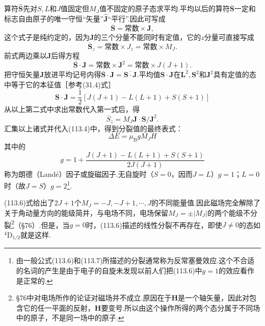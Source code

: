 算符$\hat{\boldsymbol{S}}$先对$S,L$和$J$值固定但$M_J$值不固定的原子态求平均.平均以后的算符$\overline{\boldsymbol{S}}$一定和标志自由原子的唯一守恒“矢量”$\hat{\boldsymbol{J}}$“平行”.因此可写成
\begin{equation*}
  \overline{\boldsymbol{S}}=\text{常数}\times\boldsymbol{J},
\end{equation*}
这个式子是纯约定的，因为$\boldsymbol{J}$的三个分量不能同时有定值，它的$z$分量可直接写成
\begin{equation*}
  \overline{\boldsymbol{S}}_z=\text{常数}\times J_z=\text{常数}\times M_J.
\end{equation*}
前式两边乘以$\boldsymbol{J}$后得方程
\begin{equation*}
  \overline{\boldsymbol{S}}\cdot\boldsymbol{J}=\text{常数}\times\boldsymbol{J}^2
  =\text{常数}\times J(J+1).
\end{equation*}
把守恒矢量$\boldsymbol{J}$放进平均记号内得$\overline{\boldsymbol{S}}\cdot\boldsymbol{J}=\overline{\boldsymbol{S}\cdot\boldsymbol{J}}$.平均值$\boldsymbol{S}\cdot\boldsymbol{J}$在$\boldsymbol{L}^2,\boldsymbol{S}^2$和$\boldsymbol{J}^2$具有定值的态中等于它的本征值［参考(31.4)式］
\begin{equation*}
  \boldsymbol{S}\cdot\boldsymbol{J}=\frac{1}{2}[J(J+1)-L(L+1)+S(S+1)]
\end{equation*}
从以上第二式中求出常数代入第一式后，得
\begin{equation}
  \overline{S}_z=M_J\boldsymbol{J}\cdot\boldsymbol{S}/\boldsymbol{J}^2.
\end{equation}
汇集以上诸式并代入(113.4)中，得到分裂值的最终表式：
\begin{equation}
  \Delta E=\mu_\mathrm{B}gM_JH
\end{equation}
其中的
\begin{equation}
  g=1+\frac{J(J+1)-L(L+1)+S(S+1)}{2J(J+1)}
\end{equation}
称为朗德（Land\'e）因子或旋磁因子.无自旋时（$S=0$，因而$J=L$）$g=1$；$L=0$时（故$J=S$）$g=2$\footnote{由一般公式(113.6)和(113.7)所描述的分裂通常称为反常塞曼效应.这个不合适的名词的产生是由于电子的自旋未发现以前人们把(113.6)中$g=1$的效应看作是正常的.}.

(113.6)式给出了$2J+1$个$M_J=-J,-J+1,\cdots,J$的不同能量值.因此磁场完全解除了关于角动量方向的能级简并，与电场不同，电场保留$M_J=\pm|M_J|$的两个能级不分裂\footnote{§76中对电场所作的论证对磁场并不成立.原因在于$\boldsymbol{H}$是一个轴矢量，因此对包含它的任一平面的反射，$\boldsymbol{H}$要变号.所以由这个操作所得的两个态分属于不同场中的原子，不是同一场中的原子.}（§76）.但是，当$g=0$时，(113.6)描述的线性分裂不再存在，即使$J\neq0$的态如$^4\mathrm{D}_{1/2}$就是这样.

